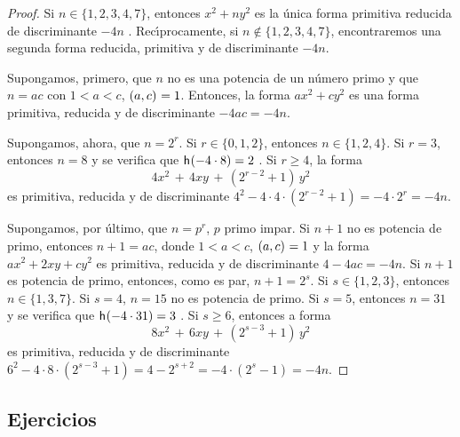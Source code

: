 \begin{proof}
	Si $n\in\{1,2,3,4,7\}$, entonces $x^2+ny^2$ es la \'unica
	forma primitiva reducida de discriminante $-4n$
	\quedacomoejercicio.%
	Rec\'{\i}procamente, si $n\not\in\{1,2,3,4,7\}$, encontraremos
	una segunda forma reducida, primitiva y de discriminante $-4n$.

	Supongamos, primero, que $n$ no es una potencia de un n\'umero
	primo y que $n=ac$ con $1<a<c$, $\left({a,c}\right)_{}=1$. Entonces, la
	forma $ax^2+cy^2$ es una forma primitiva, reducida y de
	discriminante $-4ac=-4n$.

	Supongamos, ahora, que $n=2^r$. Si $r\in\{0,1,2\}$, entonces
	$n\in\{1,2,4\}$. Si $r=3$, entonces $n=8$ y se verifica que
	$\mathsf{h}_{}(-4\cdot 8)=2$ \quedacomoejercicio. Si $r\geq 4$,
	la forma
	\begin{displaymath}
		4x^2\,+\,4xy\,+\,(2^{r-2}+1)\,y^2
	\end{displaymath}
	es primitiva, reducida y de discriminante
	$4^2-4\cdot 4\cdot(2^{r-2}+1)=-4\cdot 2^r=-4n$.

	Supongamos, por \'ultimo, que $n=p^r$, $p$ primo impar.
	Si $n+1$ no es potencia de primo, entonces $n+1=ac$, donde
	$1<a<c$, $\left({a,c}\right)_{}=1$ y la forma
	\begin{math}
		ax^2+2xy+cy^2
	\end{math}
	es primitiva, reducida y de discriminante $4-4ac=-4n$.
	Si $n+1$ es potencia de primo, entonces, como es par,
	$n+1=2^s$. Si $s\in\{1,2,3\}$, entonces $n\in\{1,3,7\}$.
	Si $s=4$, $n=15$ no es potencia de primo. Si $s=5$, entonces
	$n=31$ y se verifica que $\mathsf{h}_{}(-4\cdot 31)=3$
	\quedacomoejercicio. Si $s\geq 6$, entonces a forma
	\begin{displaymath}
		8x^2\,+\,6xy\,+\,(2^{s-3}+1)\,y^2
	\end{displaymath}
	es primitiva, reducida y de discriminante
	$6^2-4\cdot 8\cdot(2^{s-3}+1)=4-2^{s+2}=-4\cdot(2^s-1)=-4n$.
\end{proof}

\subsection*{Ejercicios}


